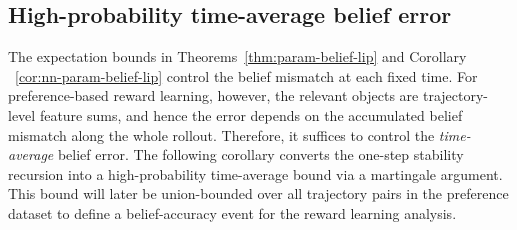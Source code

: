 \documentclass[10pt]{article} %
\theoremstyle{plain}
\theoremstyle{definition}
\theoremstyle{remark}
\begin{document}
\subsection{High-probability time-average belief error}
\label{subsec:belief-highprob}

The expectation bounds in Theorems~\ref{thm:param-belief-lip} and Corollary ~\ref{cor:nn-param-belief-lip} control the belief mismatch at each fixed time. For preference-based reward learning, however, the relevant objects are trajectory-level feature sums, and hence the error
depends on the accumulated belief mismatch along the whole rollout. Therefore, it suffices to control the \emph{time-average} belief error. The following corollary converts the one-step
stability recursion into a high-probability time-average bound via a martingale
argument. This bound will later be union-bounded over all trajectory pairs in the
preference dataset to define a belief-accuracy event for the reward learning analysis.
\end{document}
